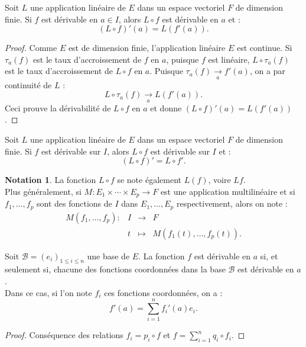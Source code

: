 \documentclass[french]{article}
\theoremstyle{plain}
\theoremstyle{definition}
\newtheorem*{notation}{Notation}
\theoremstyle{remark}
\begin{document}
\begin{prop}%
	Soit $L$ une application linéaire de $E$ dans un espace vectoriel $F$ de dimension finie. Si $f$ est dérivable en $a\in I$, alors $L\circ f$ est dérivable en $a$ et :
	$$(L\circ f)'(a)=L(f'(a)).$$
\end{prop}
\begin{proof}
	Comme $E$ est de dimension finie, l'application linéaire $E$ est continue. Si $\tau_a(f)$ est le taux d'accroissement de $f$ en $a$, puisque $f$ est linéaire, $L\circ\tau_a(f)$ est le taux d'accroissement de $L\circ f$ en $a$. Puisque $\tau_a(f)\xrightarrow[a]{}f'(a)$, on a par continuité de $L$ :
	$$L\circ\tau_a(f)\xrightarrow[a]{}L(f'(a)).$$
	Ceci prouve la dérivabilité de $L\circ f$ en $a$ et donne $(L\circ f)'(a)=L(f'(a))$.
\end{proof}

\begin{cor}%
	Soit $L$ une application linéaire de $E$ dans un espace vectoriel $F$ de dimension finie. Si $f$ est dérivable sur $I$, alors $L\circ f$ est dérivable sur $I$ et :
	$$(L\circ f)'=L\circ f'.$$
\end{cor}

\begin{notation}
	La fonction $L\circ f$ se note également $L(f)$, voire $Lf$. \\
	Plus généralement, si $M:E_1\times\cdots\times E_p\to F$ est une application multilinéaire et si $f_1,\ldots,f_p$ sont des fonctions de $I$ dans $E_1,\ldots,E_p$ respectivement, alors on note :
	$$\begin{array}{lrcl}
		M(f_1,\ldots,f_p):&I&\longrightarrow& F\\
		&t&\longmapsto& M(f_1(t),\ldots,f_p(t)).
	\end{array}$$
\end{notation}

\begin{prop}%
	Soit $\mathcal{B}=(e_i)_{1\leqslant i\leqslant n}$ une base de $E$. La fonction $f$ est dérivable en $a$ si, et seulement si, chacune des fonctions coordonnées dans la base $\mathcal{B}$ est dérivable en $a$.\\
	Dans ce cas, si l'on note $f_i$ ces fonctions coordonnées, on a :
	$$f'(a)=\sum_{i=1}^{n}f_i'(a)e_i.$$
\end{prop}
\begin{proof}
	Conséquence des relations $f_i=p_i\circ f$ et $f=\displaystyle\sum_{i=1}^{n}q_i\circ f_i$.
\end{proof}
\end{document}

